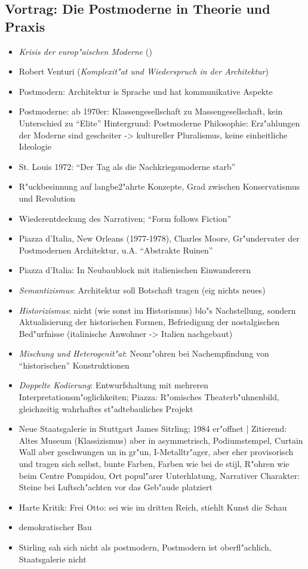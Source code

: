 \documentclass[a5paper]{scrartcl}
\begin{document}
\subsection{Vortrag: Die Postmoderne in Theorie und Praxis}

\begin{itemize}
  \item \emph{Krisis der europ"aischen Moderne} ()
  \item Robert Venturi (\emph{Komplexit"at und Wiederspruch in der Architektur})
  \item Postmodern: Architektur is Sprache und hat kommunikative Aspekte
  \item Postmoderne: ab 1970er: Klassengesellschaft zu Massengesellschaft, kein Unterschied zu "`Elite"' Hintergrund: Postmoderne Philosophie: Erz"ahlungen der Moderne sind gescheiter -> kultureller Pluralismus, keine einheitliche Ideologie
  \item St. Louis 1972: "`Der Tag als die Nachkriegsmoderne starb"'	
  \item R"uckbesinnung auf langbe2"ahrte Konzepte, Grad zwischen Konservatismus und Revolution
  \item Wiederentdeckung des Narrativen; "`Form follows Fiction"'
  \item Piazza d'Italia, New Orleans (1977-1978), Charles Moore, Gr"undervater der Postmodernen Architektur, u.A. "`Abstrakte Ruinen"'
  \item Piazza d'Italia: In Neubaublock mit italienischen Einwanderern 
  \item \emph{Semantizismus}: Architektur soll Botschaft tragen (eig nichts neues)
  \item \emph{Historizismus}: nicht (wie sonst im Historismus) blo"s Nachstellung, sondern Aktualisierung der historischen Formen, Befriedigung der nostalgischen Bed"urfnisse (italinische Anwohner -> Italien nachgebaut)
  \item \emph{Mischung und Heterogenit"at}: Neonr"ohren bei Nachempfindung von "`historischen"' Konstruktionen
  \item \emph{Doppelte Kodierung}: Entwurfshaltung mit mehreren Interpretationsm"oglichkeiten; Piazza: R"omisches Theaterb"uhnenbild, gleichzeitig wahrhaftes st"adtebauliches Projekt
  \item Neue Staatsgalerie in Stuttgart James Sitrling; 1984 er"offnet | Zitierend: Altes Museum (Klassizismus) aber in asymmetrisch, Podiumstempel, Curtain Wall aber geschwungen un in gr"un, I-Metalltr"ager, aber eher provisorisch und tragen sich selbst, bunte Farben, Farben wie bei de stijl, R"ohren wie beim Centre Pompidou, Ort popul"arer Unterhlatung, Narrativer Charakter: Steine bei Luftsch"achten vor das Geb"aude platziert
  \item Harte Kritik: Frei Otto: sei wie im dritten Reich, stiehlt Kunst die Schau
  \item demokratischer Bau
  \item Stirling sah sich nicht als postmodern, Postmodern ist oberfl"achlich, Staatsgalerie nicht
\end{itemize}
\end{document}
